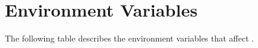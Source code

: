 


\chapter{\label{environment}Environment Variables}

The following table describes the environment variables that affect {\CDO}.

